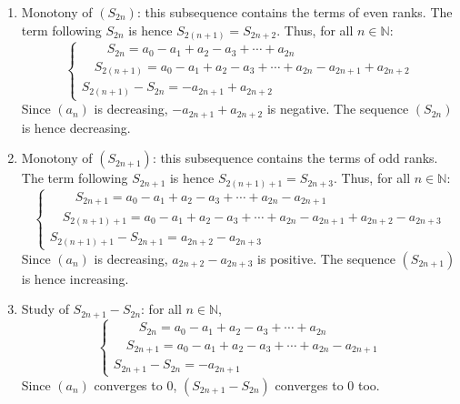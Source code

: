 \documentclass[notitlepage]{math}
\begin{document}
\begin{enumerate}
    \item Monotony of $(S_{2n})$: this subsequence contains the terms of even ranks. The term following $S_{2n}$ is hence $S_{2(n+1)} = S_{2n+2}$. Thus, for all $n \in \mathbb{N}$:
    \[ \begin{cases}
           \qquad S_{2n} = a_0 - a_1 + a_2 - a_3 + \cdots + a_{2n}\\
            \quad S_{2(n+1)} = a_0 - a_1 + a_2 - a_3 + \cdots + a_{2n} - a_{2n+1} + a_{2n+2}\\
        \hline
        S_{2(n+1)} - S_{2n} = - a_{2n+1} + a_{2n+2}
    \end{cases}\]
    Since $(a_n)$ is decreasing, $-a_{2n+1} + a_{2n+2}$ is negative. The sequence $(S_{2n})$ is hence decreasing.
    \item Monotony of $(S_{2n+1})$: this subsequence contains the terms of odd ranks. The term following $S_{2n+1}$ is hence $S_{2(n+1)+1} = S_{2n+3}$. Thus, for all $n \in \mathbb{N}$:
    \[ \begin{cases}
           \qquad S_{2n+1} = a_0 - a_1 + a_2 - a_3 + \cdots + a_{2n} - a_{2n+1}\\
            \quad S_{2(n+1)+1} = a_0 - a_1 + a_2 - a_3 + \cdots + a_{2n} - a_{2n+1} + a_{2n+2} - a_{2n+3}\\
        \hline
        S_{2(n+1)+1} - S_{2n+1} = a_{2n+2} - a_{2n+3}
    \end{cases}\]
    Since $(a_n)$ is decreasing, $a_{2n+2} - a_{2n+3}$ is positive. The sequence $(S_{2n+1})$ is hence increasing.
    \item Study of $S_{2n+1} - S_{2n}$: for all $n \in \mathbb{N}$,
    \[ \begin{cases}
        \qquad S_{2n} = a_0 - a_1 + a_2 - a_3 + \cdots + a_{2n}\\
         \quad S_{2n+1} = a_0 - a_1 + a_2 - a_3 + \cdots + a_{2n} - a_{2n+1}\\
     \hline
     S_{2n+1} - S_{2n} = -a_{2n+1}
 \end{cases}\]
 Since $(a_n)$ converges to $0$, $(S_{2n+1} - S_{2n})$ converges to $0$ too.\\
 

\end{enumerate}
\end{document}
